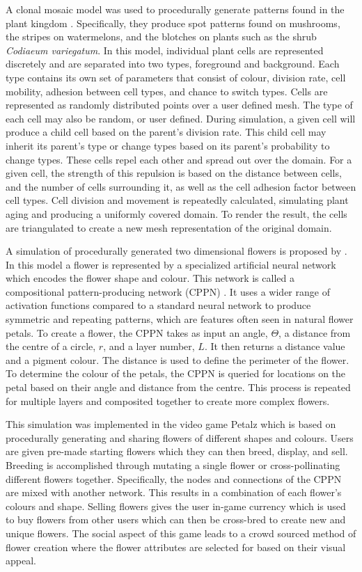 A clonal mosaic model was used to procedurally generate patterns found in the plant kingdom \citep{binsfeld2011}. Specifically, they produce spot patterns found on mushrooms, the stripes on watermelons, and the blotches on plants such as the shrub \textit{Codiaeum variegatum}. In this model, individual plant cells are represented discretely and are separated into two types, foreground and background. Each type contains its own set of parameters that consist of colour, division rate, cell mobility, adhesion between cell types, and chance to switch types. Cells are represented as randomly distributed points over a user defined mesh. The type of each cell may also be random, or user defined. During simulation, a given cell will produce a child cell based on the parent's division rate. This child cell may inherit its parent's type or change types based on its parent's probability to change types. These cells repel each other and spread out over the domain. For a given cell, the strength of this repulsion is based on the distance between cells, and the number of cells surrounding it, as well as the cell adhesion factor between cell types. Cell division and movement is repeatedly calculated, simulating plant aging and producing a uniformly covered domain. To render the result, the cells are triangulated to create a new mesh representation of the original domain. 

A simulation of procedurally generated two dimensional flowers is proposed by \citep{risi2012}. In this model a flower is represented by a specialized artificial neural network which encodes the flower shape and colour. This network is called a compositional pattern-producing network (CPPN) \citep{stanley2007}. It uses a wider range of activation functions compared to a standard neural network to produce symmetric and repeating patterns, which are features often seen in natural flower petals. To create a flower, the CPPN takes as input an angle, $\Theta$, a distance from the centre of a circle, $r$, and a layer number, $L$. It then returns a distance value and a pigment colour. The distance is used to define the perimeter of the flower. To determine the colour of the petals, the CPPN is queried for locations on the petal based on their angle and distance from the centre. This process is repeated for multiple layers and composited together to create more complex flowers. 

This simulation was implemented in the video game Petalz which is based on procedurally generating and sharing flowers of different shapes and colours. Users are given pre-made starting flowers which they can then breed, display, and sell. Breeding is accomplished through mutating a single flower or cross-pollinating different flowers together. Specifically, the nodes and connections of the CPPN are mixed with another network. This results in a combination of each flower's colours and shape. Selling flowers gives the user in-game currency which is used to buy flowers from other users which can then be cross-bred to create new and unique flowers. The social aspect of this game leads to a crowd sourced method of flower creation where the flower attributes are selected for based on their visual appeal.

